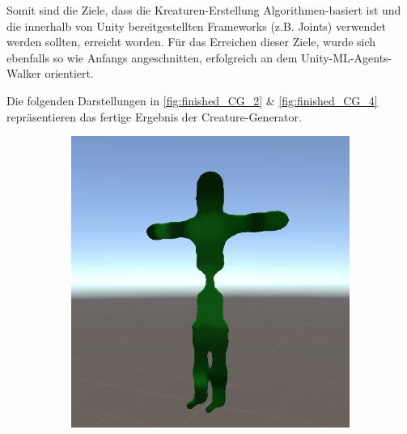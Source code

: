 Somit sind die Ziele, dass die Kreaturen-Erstellung Algorithmen-basiert ist und die innerhalb von Unity bereitgestellten Frameworks (z.B. Joints) verwendet werden sollten, erreicht worden. Für das Erreichen dieser Ziele, wurde sich ebenfalls so wie Anfangs angeschnitten, erfolgreich an dem Unity-ML-Agents-Walker orientiert.

Die folgenden Darstellungen in \ref{fig:finished_CG_2} \& \ref{fig:finished_CG_4} repräsentieren das fertige Ergebnis der Creature-Generator.

\begin{figure}[ht]
    \centering
    \begin{subfigure}[b]{0.2\textwidth}
        \centering        
        \includegraphics[width=\textwidth, height=\textwidth]{resources/img/Finished_Creatures_2/creature_1}
    \end{subfigure}
    \begin{subfigure}[b]{0.2\textwidth}
        \centering

\end{subfigure}
\end{figure}
